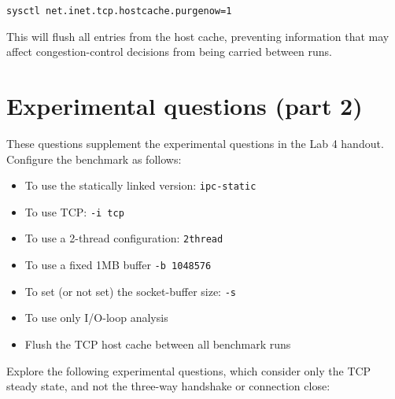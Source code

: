 \documentclass[a4paper,10pt]{article}
\begin{document}
\begin{verbatim}
sysctl net.inet.tcp.hostcache.purgenow=1
\end{verbatim}

\noindent
This will flush all entries from the host cache, preventing information that
may affect congestion-control decisions from being carried between runs.

\section*{Experimental questions (part 2)}

These questions supplement the experimental questions in the Lab 4 handout.
Configure the benchmark as follows:

\begin{itemize}
\item To use the statically linked version: \texttt{ipc-static}
\item To use TCP: \texttt{-i tcp}
\item To use a 2-thread configuration: \texttt{2thread}
\item To use a fixed 1MB buffer \texttt{-b 1048576}
\item To set (or not set) the socket-buffer size: \texttt{-s}
\item To use only I/O-loop analysis
\item Flush the TCP host cache between all benchmark runs
\end{itemize}

\noindent
Explore the following experimental questions, which consider only the TCP
steady state, and not the three-way handshake or connection close:
\end{document}
